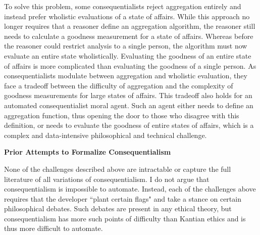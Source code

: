 \begin{isabellebody}
\begin{isamarkuptext}
To solve this problem, some consequentialists reject aggregation entirely and instead prefer wholistic
evaluations of a state of affairs. While this approach no longer requires that a reasoner define an 
aggregation algorithm, the reasoner still needs to calculate a goodness measurement for a state of 
affairs. Whereas before the reasoner could restrict analysis to a single person, the algorithm must now 
evaluate an entire state wholistically. Evaluating the goodness of an entire state of affairs is more complicated
than evaluating the goodness of a single person. As consequentialists modulate between aggregation 
and wholistic evaluation, they face a tradeoff between the difficulty of aggregation and the complexity 
of goodness measurements for large states of affairs. This tradeoff also holds for an automated
consequentialist moral agent. Such an agent either needs to define an aggregation function, thus opening 
the door to those who disagree with this definition, or needs to evaluate the goodness of entire states
of affairs, which is a complex and data-intensive philosophical and technical challenge.%
\end{isamarkuptext}\isamarkuptrue%
%
\begin{isamarkuptext}%
\textbf{Prior Attempts to Formalize Consequentialism}%
\end{isamarkuptext}\isamarkuptrue%
%
\begin{isamarkuptext}%
None of the challenges described above are intractable or capture the full literature of 
all variations of consequentialism. I do not argue that consequentialism is 
impossible to automate. Instead, each of the challenges above requires that the developer 
``plant certain flags" and take a stance on certain philosophical debates. Such debates are present in 
any ethical theory, but consequentialism has more such points of difficulty than Kantian ethics and 
is thus more difficult to automate. 


\end{isamarkuptext}
\end{isabellebody}
